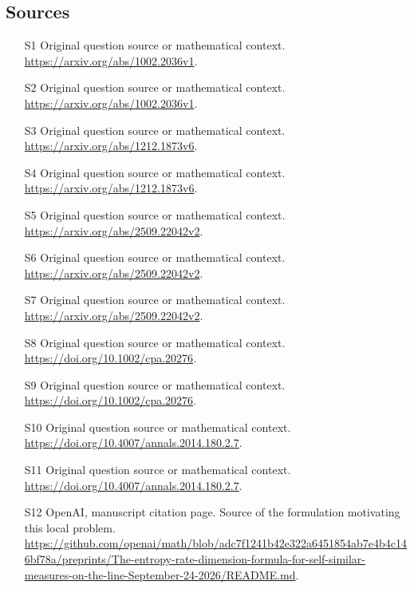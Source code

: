 \documentclass[11pt]{article}
\begin{document}
\subsection{Sources}
\begin{itemize}
\item[S1] Original question source or mathematical context.
\url{https://arxiv.org/abs/1002.2036v1}.
\item[S2] Original question source or mathematical context.
\url{https://arxiv.org/abs/1002.2036v1}.
\item[S3] Original question source or mathematical context.
\url{https://arxiv.org/abs/1212.1873v6}.
\item[S4] Original question source or mathematical context.
\url{https://arxiv.org/abs/1212.1873v6}.
\item[S5] Original question source or mathematical context.
\url{https://arxiv.org/abs/2509.22042v2}.
\item[S6] Original question source or mathematical context.
\url{https://arxiv.org/abs/2509.22042v2}.
\item[S7] Original question source or mathematical context.
\url{https://arxiv.org/abs/2509.22042v2}.
\item[S8] Original question source or mathematical context.
\url{https://doi.org/10.1002/cpa.20276}.
\item[S9] Original question source or mathematical context.
\url{https://doi.org/10.1002/cpa.20276}.
\item[S10] Original question source or mathematical context.
\url{https://doi.org/10.4007/annals.2014.180.2.7}.
\item[S11] Original question source or mathematical context.
\url{https://doi.org/10.4007/annals.2014.180.2.7}.
\item[S12] OpenAI, manuscript citation page. Source of the formulation motivating this local problem.
\url{https://github.com/openai/math/blob/adc7f1241b42e322a6451854ab7e4b4c146bf78a/preprints/The-entropy-rate-dimension-formula-for-self-similar-measures-on-the-line-September-24-2026/README.md}.
\end{itemize}
\end{document}
